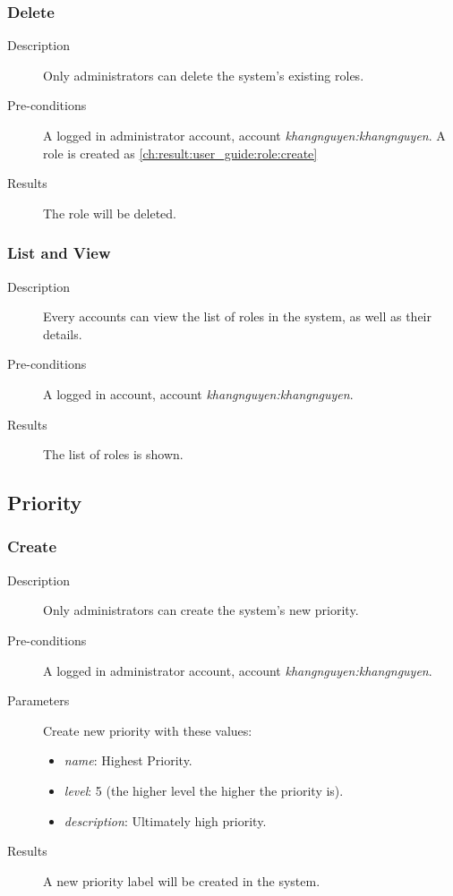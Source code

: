 \subsubsection{Delete}
\label{ch:result:user_guide:role:delete}

\begin{description}
\item[Description] Only administrators can delete the system's existing roles.
\item[Pre-conditions] A logged in administrator account, \eg account \emph{khangnguyen:khangnguyen}.
A role is created as \autoref{ch:result:user_guide:role:create}
\item[Results] The role will be deleted.
\end{description}

\subsubsection{List and View}
\label{ch:result:user_guide:role:list}

\begin{description}
\item[Description] Every accounts can view the list of roles in the system, as well as their details.
\item[Pre-conditions] A logged in account, \eg account \emph{khangnguyen:khangnguyen}.
\item[Results] The list of roles is shown.
\end{description}

\subsection{Priority}
\label{ch:result:user_guide:priority}
\subsubsection{Create}
\label{ch:result:user_guide:priority:create}

\begin{description}
\item[Description] Only administrators can create the system's new priority.
\item[Pre-conditions] A logged in administrator account, \eg account \emph{khangnguyen:khangnguyen}.
\item[Parameters] Create new priority with these values:
\begin{itemize}
\item \emph{name}: Highest Priority.
\item \emph{level}: 5 (the higher level the higher the priority is).
\item \emph{description}: Ultimately high priority.
\end{itemize}
\item[Results] A new priority label will be created in the system.
\end{description}

